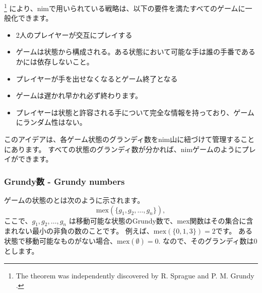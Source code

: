 
\footnote{The theorem was
independently discovered by R. Sprague \cite{spr35} and P. M. Grundy \cite{gru39}.}
により、nimで用いられている戦略は、以下の要件を満たすべてのゲームに一般化できます。

\begin{itemize}[noitemsep]
\item 2人のプレイヤーが交互にプレイする
\item ゲームは状態から構成される。ある状態において可能な手は誰の手番であるかには依存しないこと。
\item プレイヤーが手を出せなくなるとゲーム終了となる
\item ゲームは遅かれ早かれ必ず終わります。
\item プレイヤーは状態と許容される手について完全な情報を持っており、ゲームにランダム性はない。
\end{itemize}
このアイデアは、各ゲーム状態のグランディ数をnim山に紐づけて管理することにあります。
すべての状態のグランディ数が分かれば、nimゲームのようにプレイができます。

\subsubsection{Grundy数 - Grundy numbers}


ゲームの状態のとは次のように示されます。
\[\textrm{mex}(\{g_1,g_2,\ldots,g_n\}),\]
ここで、$g_1,g_2,\ldots,g_n$
は移動可能な状態のGrundy数で、mex関数はその集合に含まれない最小の非負の数のことです。
例えば、$\textrm{mex}(\{0,1,3\})=2$です。
ある状態で移動可能なものがない場合、$\textrm{mex}(\emptyset)=0$.
なので、そのグランディ数は0とします。

